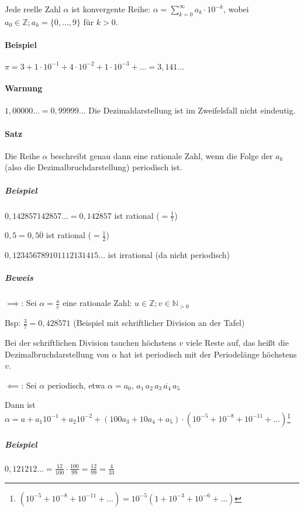 \documentclass[14pt,a4paper]{article}
\newcommand{\N}{\ensuremath{\mathbb{N}}}
\newcommand{\Z}{\ensuremath{\mathbb{Z}}}
\begin{document}
  Jede reelle Zahl $\alpha$ ist konvergente Reihe: $ \alpha = \sum_{k=0}^\infty
  a_k \cdot 10^{-k}$, wobei $a_0 \in \Z ; a_k = \{0, \ldots, 9\}$ für $k > 0 $.

  \paragraph{Beispiel}
  $ \pi = 3 + 1 \cdot 10^{-1} + 4 \cdot 10^{-2} + 1 \cdot 10^{-3} + \ldots =
  3,141\ldots$

  \paragraph{Warnung}
  $1,00000\ldots = 0,99999\ldots$
  Die Dezimaldarstellung ist im Zweifelsfall nicht eindeutig.

  \paragraph{Satz}
  Die Reihe $\alpha$ beschreibt genau dann eine rationale Zahl, wenn die Folge
  der $a_k$ (also die Dezimalbruchdarstellung) periodisch ist.

  \subparagraph{Beispiel}
  $0,142857142857\ldots = 0,\overline{142857}$ ist rational ($= \frac{1}{7}$)

  $0,5 = 0,5\overline{0}$ ist rational ($ = \frac{1}{2}$)

  $ 0,123456789101112131415\ldots $ ist irrational (da nicht periodisch)

  \subparagraph{Beweis}
  $\implies$: Sei $\alpha = \frac{u}{v}$ eine rationale Zahl: $ u \in \Z; v \in
  \N_{>0}$

  Bsp: $\frac{3}{7} = 0,\overline{428571} $ (Beispiel mit schriftlicher Division
  an der Tafel)

  Bei der schriftlichen Division tauchen höchstens $v$ viele Reste auf, das
  heißt die Dezimalbruchdarstellung von $\alpha$ hat ist periodisch mit der
  Periodelänge höchstens $v$.

  $\impliedby$: Sei $\alpha$ periodisch, etwa $\alpha =
  a_0,\,a_1\,a_2\,\overline{a_3\,a_4\,a_5}$

  Dann ist $\alpha = a + a_1 10^{-1} + a_2 10^{-2} + (100 a_3 + 10 a_4 + a_5)
  \cdot (10^{-5} + 10^{-8} + 10^{-11} + \ldots)$\;\;\;\footnote{ $ (10^{-5} + 10^{-8}
    + 10^{-11} + \ldots) = 10^{-5} (1 + 10^{-3} +
    10^{-6} + \ldots )$}
  
  \subparagraph{Beispiel}
  $ 0,121212\ldots = \frac{12}{100} \cdot \frac{100}{99} = \frac{12}{99} =
  \frac{4}{33} $
\end{document}
